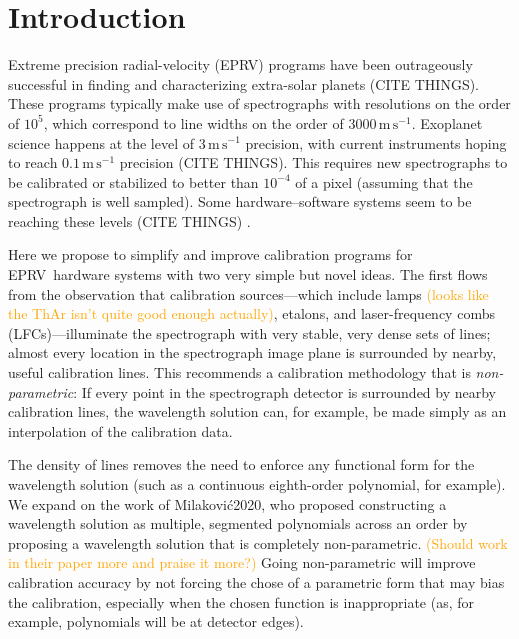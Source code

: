 \documentclass[twocolumn]{aastex63}
\newcommand{\lz}[1]{\textcolor{orange}{#1}}
\newcommand{\acronym}[1]{{\small{#1}}}
\newcommand{\eprv}{\acronym{EPRV}}
\newcommand{\lfc}{\acronym{LFC}}
\newcommand{\mps}{\mathrm{m\,s^{-1}}}
\begin{document}

\section{Introduction} 

Extreme precision radial-velocity (\eprv) programs have been outrageously successful in finding and characterizing extra-solar planets (CITE THINGS).  
These programs typically make use of spectrographs with resolutions on the order of $10^5$, which correspond to line widths on the order of $3000\,\mps$.  
Exoplanet science happens at the level of $3\,\mps$ precision, with current instruments hoping to reach $0.1\,\mps$ precision (CITE THINGS).  
This requires new spectrographs to be calibrated or stabilized to better than $10^{-4}$ of a pixel (assuming that the spectrograph is well sampled).  
Some hardware--software systems seem to be reaching these levels (CITE THINGS) .

Here we propose to simplify and improve calibration programs for \eprv\ hardware systems with two very simple but novel ideas.  
The first flows from the observation that calibration sources---which include lamps \lz{(looks like the ThAr isn't quite good enough actually)}, etalons, and laser-frequency combs (\lfc s)---illuminate the spectrograph with very stable, very dense sets of lines; almost every location in the spectrograph image plane is surrounded by nearby,
useful calibration lines.
This recommends a calibration methodology that is \emph{non-parametric}:
If every point in the spectrograph detector is surrounded by nearby calibration lines, the wavelength solution can, for example, be made simply as an interpolation of the calibration data.

The density of lines removes the need to enforce any functional form for the wavelength solution (such as a continuous eighth-order polynomial, for example).  We expand on the work of Milakovi\'{c}2020, who proposed constructing a wavelength solution as multiple, segmented polynomials across an order by proposing a wavelength solution that is completely non-parametric.  \lz{(Should work in their paper more and praise it more?)}
Going non-parametric will improve calibration accuracy by not forcing the chose of a parametric form that may bias the calibration, especially when the chosen function is inappropriate (as, for example, polynomials will be at detector edges).
\end{document}
